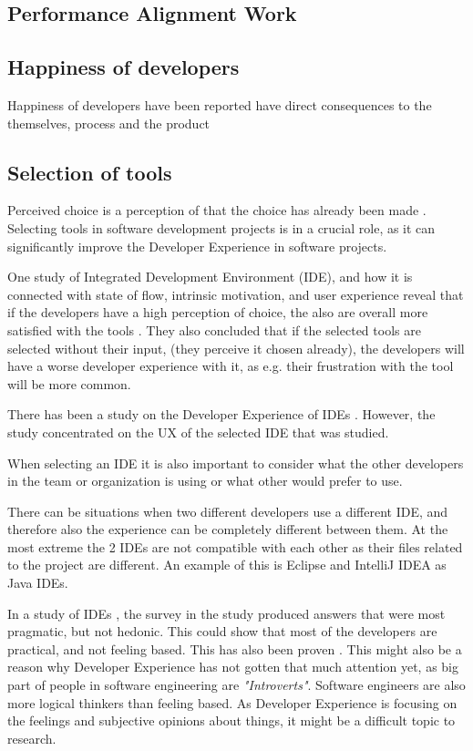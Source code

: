 \documentclass[english, 12pt, a4paper, sci, utf8, a-1b, online]{aaltothesis}
\begin{document}
\subsection{Performance Alignment Work}

\subsection{Happiness of developers}

Happiness of developers have been reported have direct consequences to the themselves, process and the product \cite{unhappy-developers}

\subsection{Selection of tools}

Perceived choice is a perception of that the choice has already been made \cite{kuusinen-flow}. Selecting tools in software development projects is in a crucial role, as it can significantly improve the Developer Experience in software projects.

One study of Integrated Development Environment (IDE), and how it is connected with state of flow, intrinsic motivation, and user experience reveal that if the developers have a high perception of choice, the also are overall more satisfied with the tools \cite{kuusinen-flow}. They also concluded that if the selected tools are selected without their input, (they perceive it chosen already), the developers will have a worse developer experience with it, as e.g. their frustration with the tool will be more common.

There has been a study on the Developer Experience of IDEs \cite{software-developers-as-users}. However, the study concentrated on the UX of the selected IDE that was studied.

When selecting an IDE it is also important to consider what the other developers in the team or organization is using or what other would prefer to use.

There can be situations when two different developers use a different IDE, and therefore also the experience can be completely different between them. At the most extreme the 2 IDEs are not compatible with each other as their files related to the project are different. An example of this is Eclipse and IntelliJ IDEA as Java IDEs.

In a study of IDEs \cite{software-developers-as-users}, the survey in the study produced answers that were most pragmatic, but not hedonic. This could show that most of the developers are practical, and not feeling based. This has also been proven \cite{personality-software}. This might also be a reason why Developer Experience has not gotten that much attention yet, as big part of people in software engineering are \textit{"Introverts"}. Software engineers are also more logical thinkers than feeling based. As Developer Experience is focusing on the feelings and subjective opinions about things, it might be a difficult topic to research.
\end{document}
